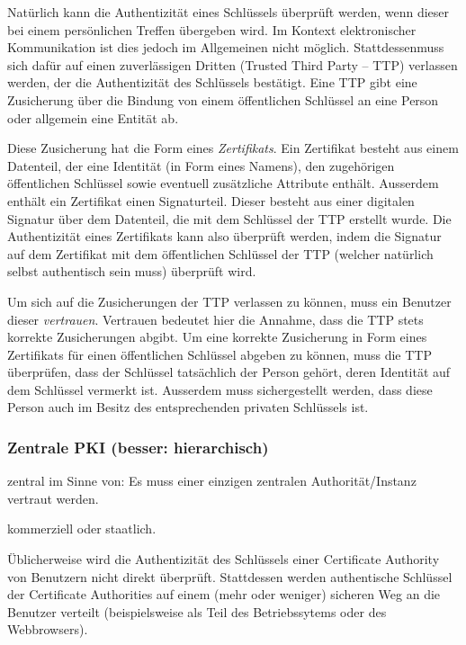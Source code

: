 Nat\"urlich kann die Authentizit\"at eines Schl\"ussels \"uberpr\"uft
werden, wenn dieser bei einem pers\"onlichen Treffen \"ubergeben
wird. Im Kontext elektronischer Kommunikation ist dies jedoch im
Allgemeinen nicht m\"oglich. Stattdessenmuss sich daf\"ur auf einen
zuverl\"assigen Dritten (Trusted Third Party -- TTP) verlassen werden,
der die Authentizit\"at des Schl\"ussels best\"atigt. Eine TTP gibt
eine Zusicherung \"uber die Bindung von einem \"offentlichen
Schl\"ussel an eine Person oder allgemein eine Entit\"at ab.

Diese Zusicherung hat die Form eines \emph{Zertifikats}. Ein
Zertifikat besteht aus einem Datenteil, der eine Identit\"at (in Form
eines Namens), den zugeh\"origen \"offentlichen Schl\"ussel sowie
eventuell zus\"atzliche Attribute enth\"alt. Ausserdem enth\"alt ein
Zertifikat einen Signaturteil. Dieser besteht aus einer digitalen
Signatur \"uber dem Datenteil, die mit dem Schl\"ussel der TTP
erstellt wurde. Die Authentizit\"at eines Zertifikats kann also
\"uberpr\"uft werden, indem die Signatur auf dem Zertifikat mit dem
\"offentlichen Schl\"ussel der TTP (welcher nat\"urlich selbst
authentisch sein muss) \"uberpr\"uft wird.

Um sich auf die Zusicherungen der TTP verlassen zu k\"onnen, muss ein
Benutzer dieser \emph{vertrauen}. Vertrauen bedeutet hier die Annahme,
dass die TTP stets korrekte Zusicherungen abgibt. Um eine korrekte
Zusicherung in Form eines Zertifikats f\"ur einen \"offentlichen
Schl\"ussel abgeben zu k\"onnen, muss die TTP \"uberpr\"ufen, dass der
Schl\"ussel tats\"achlich der Person geh\"ort, deren Identit\"at auf
dem Schl\"ussel vermerkt ist. Ausserdem muss sichergestellt werden,
dass diese Person auch im Besitz des entsprechenden privaten
Schl\"ussels ist.

\subsubsection{Zentrale PKI (besser: hierarchisch)}
\label{ch:Grundlagen:sec:PublicKeyCrypto:subsec:KeyAuth:subsubsec:PKI}

zentral im Sinne von: Es muss einer einzigen zentralen
Authorit\"at/Instanz vertraut werden.

kommerziell oder staatlich.

\"Ublicherweise wird die Authentizit\"at des Schl\"ussels einer
Certificate Authority von Benutzern nicht direkt
\"uberpr\"uft. Stattdessen werden authentische Schl\"ussel der
Certificate Authorities auf einem (mehr oder weniger) sicheren Weg an
die Benutzer verteilt (beispielsweise als Teil des Betriebssytems oder
des Webbrowsers).

